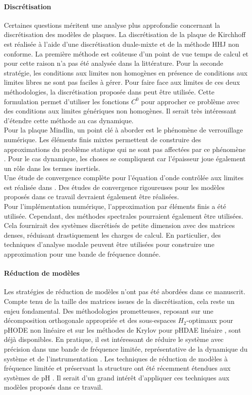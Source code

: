 \paragraph{Discrétisation}
Certaines questions méritent une analyse plus approfondie concernant la discrétisation des modèles de plaques. La discrétisation de la plaque de Kirchhoff est réalisée à l'aide d'une discrétisation duale-mixte et de la méthode HHJ non conforme. La première méthode est coûteuse d'un point de vue temps de calcul et pour cette raison n'a pas été analysée dans la littérature. Pour la seconde stratégie, les conditions aux limites non homogènes en présence de conditions aux limites libres ne sont pas faciles à gérer. Pour faire face aux limites de ces deux méthodologies, la discrétisation proposée dans \cite{rafetseder2018siam} peut être utilisée. Cette formulation permet d'utiliser les fonctions $ C^0$ pour approcher ce problème avec des conditions aux limites génériques non homogènes. Il serait très intéressant d'étendre cette méthode au cas dynamique. \\ Pour la plaque Mindlin, un point clé à aborder est le phénomène de verrouillage numérique. Les éléments finis mixtes permettent de construire des approximations du problème statique qui ne sont pas affectées par ce phénomène \cite{veiga2013}. Pour le cas dynamique, les choses se compliquent car l'épaisseur joue également un rôle dans les termes inertiels. \\ Une étude de convergence complète pour l'équation d'onde contrôlée aux limites est réalisée dans \cite{haine2020numerical}. Des études de convergence rigoureuses pour les modèles proposés dans ce travail devraient également être réalisées. \\ Pour l'implémentation numérique, l'approximation par éléments finis a été utilisée. Cependant, des méthodes spectrales pourraient également être utilisées. Cela fournirait des systèmes discrétisés de petite dimension avec des matrices denses, réduisant drastiquement les charges de calcul. En particulier, des techniques d'analyse modale peuvent être utilisées pour construire une approximation pour une bande de fréquence donnée.

\paragraph{Réduction de modèles}
Les stratégies de réduction de modèles n'ont pas été abordées dans ce manuscrit. Compte tenu de la taille des matrices issues de la discrétisation, cela reste un enjeu fondamental. Des méthodologies prometteuses, reposant sur une décomposition orthogonale appropriée et des sous-espaces $H_2$-optimaux pour pHODE  non linéaire \cite{chaturantabut2016} et sur les méthodes de Krylov pour pHDAE linéaire \cite{egger2018}, sont déjà disponibles. En pratique, il est intéressant de réduire le système avec précision dans une bande de fréquence limitée, représentative de la dynamique du système et de l'instrumentation \cite{vuillemin2014frequency}. Les techniques de réduction de modèles à fréquence limitée et préservant la structure ont été récemment étendues aux systèmes de pH \cite{xu2020sp}. Il serait d'un grand intérêt d'appliquer ces techniques aux modèles proposés dans ce travail.

